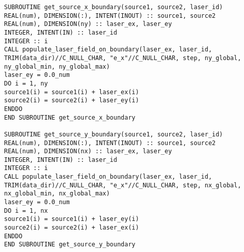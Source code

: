 \begin{lstlisting}[style=FORTRAN, caption=Fortran subroutines for populating laser sources on boundaries]
SUBROUTINE get_source_x_boundary(source1, source2, laser_id) 
REAL(num), DIMENSION(:), INTENT(INOUT) :: source1, source2
REAL(num), DIMENSION(ny) :: laser_ex, laser_ey
INTEGER, INTENT(IN) :: laser_id
INTEGER :: i
CALL populate_laser_field_on_boundary(laser_ex, laser_id, TRIM(data_dir)//C_NULL_CHAR, "e_x"//C_NULL_CHAR, step, ny_global, ny_global_min, ny_global_max)
laser_ey = 0.0_num
DO i = 1, ny
source1(i) = source1(i) + laser_ex(i)
source2(i) = source2(i) + laser_ey(i)
ENDDO
END SUBROUTINE get_source_x_boundary

SUBROUTINE get_source_y_boundary(source1, source2, laser_id)
REAL(num), DIMENSION(:), INTENT(INOUT) :: source1, source2
REAL(num), DIMENSION(nx) :: laser_ex, laser_ey
INTEGER, INTENT(IN) :: laser_id
INTEGER :: i
CALL populate_laser_field_on_boundary(laser_ex, laser_id, TRIM(data_dir)//C_NULL_CHAR, "e_x"//C_NULL_CHAR, step, nx_global, nx_global_min, nx_global_max)
laser_ey = 0.0_num
DO i = 1, nx
source1(i) = source1(i) + laser_ey(i)
source2(i) = source2(i) + laser_ex(i)
ENDDO
END SUBROUTINE get_source_y_boundary
\end{lstlisting}